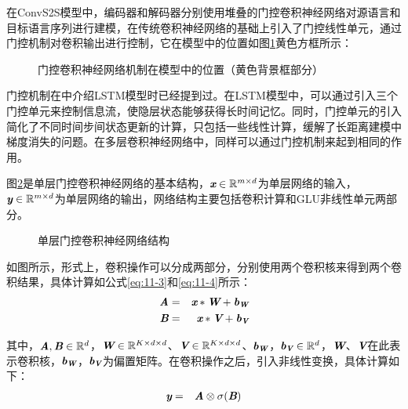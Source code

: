 \parinterval 在ConvS2S模型中，编码器和解码器分别使用堆叠的门控卷积神经网络对源语言和目标语言序列进行建模，在传统卷积神经网络的基础上引入了门控线性单元，通过门控机制对卷积输出进行控制，它在模型中的位置如图\ref{fig:11-13}黄色方框所示：

\begin{figure}[htp]
\centering

\caption{门控卷积神经网络机制在模型中的位置（黄色背景框部分）}
\label{fig:11-13}
\end{figure}

\parinterval 门控机制在{\chapterten}中介绍LSTM模型时已经提到过。在LSTM模型中，可以通过引入三个门控单元来控制信息流，使隐层状态能够获得长时间记忆。同时，门控单元的引入简化了不同时间步间状态更新的计算，只包括一些线性计算，缓解了长距离建模中梯度消失的问题。在多层卷积神经网络中，同样可以通过门控机制来起到相同的作用。

\parinterval 图\ref{fig:11-14}是单层门控卷积神经网络的基本结构，$\textbf{\em x}\in \mathbb{R}^{m\times d}$为单层网络的输入，$\textbf{\em y} \in \mathbb{R}^{m \times d}$为单层网络的输出，网络结构主要包括卷积计算和GLU非线性单元两部分。

\begin{figure}[htp]
\centering

\caption{单层门控卷积神经网络结构}
\label{fig:11-14}
\end{figure}


\parinterval 如图所示，形式上，卷积操作可以分成两部分，分别使用两个卷积核来得到两个卷积结果，具体计算如公式\eqref{eq:11-3}和\eqref{eq:11-4}所示：
\begin{eqnarray}
\textbf{\em A} & = & \textbf{\em x} * \textbf{\em W} + \textbf{\em b}_{\textbf{\em W}} \label{eq:11-3} \\
\textbf{\em B} & = & \textbf{\em x} * \textbf{\em V} + \textbf{\em b}_{\textbf{\em V}} \label{eq:11-4}
\end{eqnarray}

\noindent 其中，$\textbf{\em A},\textbf{\em B}\in \mathbb{R}^d$，$\textbf{\em W}\in \mathbb{R}^{K\times d \times d}$、$\textbf{\em V}\in \mathbb{R}^{K\times d \times d}$、$\textbf{\em b}_{\textbf{\em W}}$，$\textbf{\em b}_{\textbf{\em V}} \in \mathbb{R}^d $，$\textbf{\em W}$、$\textbf{\em V}$在此表示卷积核，$\textbf{\em b}_{\textbf{\em W}}$，$\textbf{\em b}_{\textbf{\em V}}$为偏置矩阵。在卷积操作之后，引入非线性变换，具体计算如下：
\begin{eqnarray}
\textbf{\em y} & = & \textbf{\em A} \otimes \sigma ( \textbf{\em B} )
\label{eq:11-5}
\end{eqnarray}

